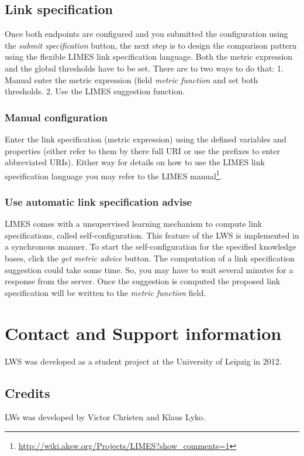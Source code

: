 \documentclass{article}
\begin{document}
\subsection{Link specification}
Once both endpoints are configured and you submitted the configuration using the \textit{submit specification}  button, the next step is to design the comparison pattern using the flexible LIMES link specification language. Both the metric expression and the global thresholds have to be set. There are to two ways to do that: 1. Manual enter the metric expression (field \textit{metric function} and set both thresholds. 2. Use the LIMES suggestion function.\\
\subsubsection{Manual configuration}
Enter the link specification (metric expression) using the defined variables and properties (either refer to them by there full URI or use the prefixes to enter abbreviated URIs). Either way for details on how to use the LIMES link specification language you may refer to the LIMES manual\footnote{\url{http://wiki.aksw.org/Projects/LIMES?show_comments=1}}.
\subsubsection{Use automatic link specification advise}
LIMES comes with a unsupervised learning mechanism to compute link specifications, called self-configuration. This feature of the LWS is implemented in a synchronous manner. To start the self-configuration for the specified knowledge bases, click the \textit{get metric advice} button. The computation of a link specification suggestion could take some time. So, you may have to wait several minutes for a response from the server. Once the suggestion is computed the proposed link specification will be written to the \textit{metric function} field.

\section{Contact and Support information}
LWS was developed as a student project at the University of Leipzig in 2012.

\subsection{Credits}
LWs was developed by Victor Christen and Klaus Lyko.
\end{document}
